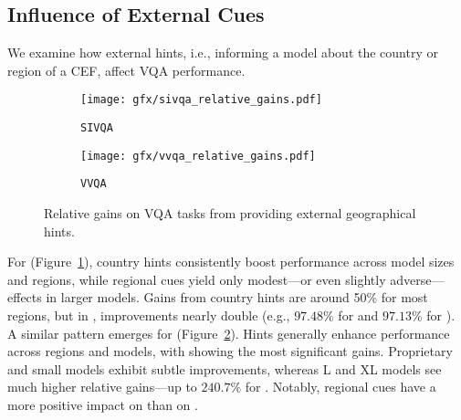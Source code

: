 \subsection{Influence of External Cues}
\label{sec:analyses:a4_external}
%
We examine how external hints, i.e., informing a model about the country or region of a CEF, affect VQA performance.
%
\begin{figure*}[t]
    \centering
    \begin{subfigure}{1.\linewidth}
        \centering
        \texttt{[image: gfx/sivqa\_relative\_gains.pdf]}
        \caption{\texttt{SIVQA}}
        \label{fig:analyses:a4:relative:sivqa}
    \end{subfigure}
    
    \begin{subfigure}{1.\linewidth}
        \centering
        \texttt{[image: gfx/vvqa\_relative\_gains.pdf]}
        \caption{\texttt{VVQA}}
        \label{fig:analyses:a4:relative:vvqa}
    \end{subfigure}
    \caption{Relative gains on VQA tasks from providing external geographical hints.}
    \label{fig:analyses:a4:relative}
\end{figure*}
%
For \sivqa (Figure~\ref{fig:analyses:a4:relative:sivqa}), country hints consistently boost performance across model sizes and regions, while regional cues yield only modest—or even slightly adverse—effects in larger models.
%
Gains from country hints are around 50\% for most regions, but in \RegSA, improvements nearly double (e.g., $97.48\%$ for  and $97.13\%$ for ).
%
A similar pattern emerges for \vvqa (Figure~\ref{fig:analyses:a4:relative:vvqa}).
%
Hints generally enhance performance across regions and models, with \RegSA showing the most significant gains.
%
Proprietary and small models exhibit subtle improvements, whereas L and XL models see much higher relative gains---up to $240.7\%$ for .
%
Notably, regional cues have a more positive impact on \vvqa than on \sivqa.
%
